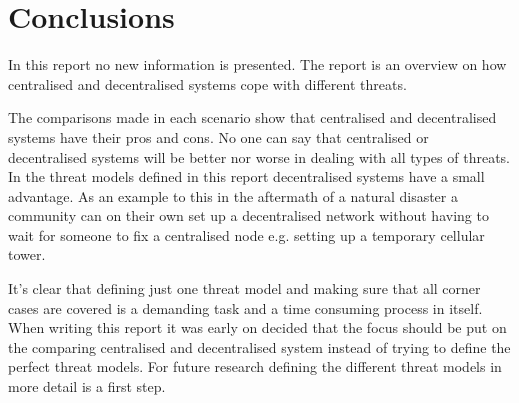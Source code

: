 \section{Conclusions}
In this report no new information is presented.
The report is an overview on how centralised and decentralised systems cope with different threats.

The comparisons made in each scenario show that centralised and decentralised systems have their pros and cons.
No one can say that centralised or decentralised systems will be better nor worse in dealing with all types of threats.
In the threat models defined in this report decentralised systems have a small advantage.
As an example to this in the aftermath of a natural disaster a community can on their own set up a decentralised network without having to wait for someone to fix a centralised node e.g. setting up a temporary cellular tower.

It's clear that defining just one threat model and making sure that all corner cases are covered is a demanding task and a time consuming process in itself.
When writing this report it was early on decided that the focus should be put on the comparing centralised and decentralised system instead of trying to define the perfect threat models.
For future research defining the different threat models in more detail is a first step.




